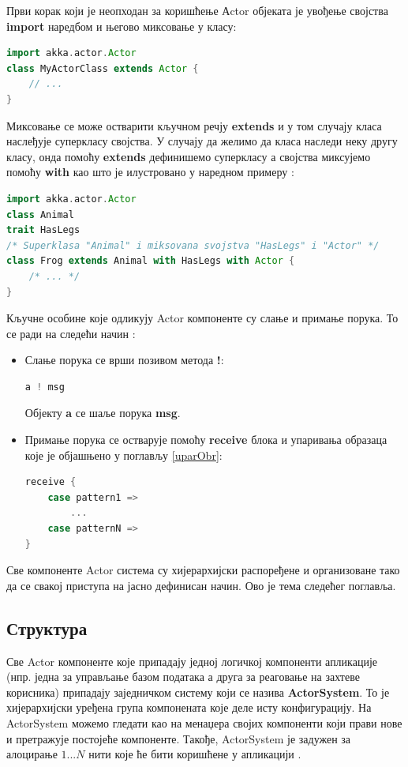 \documentclass[12pt,oneside]{memoir}
\begin{document}
Први корак који је неопходан за коришћење Аctor објеката је увођење својства \textbf{import} наредбом и његово миксовање у класу:
\begin{lstlisting}[language=Scala]
import akka.actor.Actor
class MyActorClass extends Actor {
	// ...
} 
\end{lstlisting}
Миксовање се може остварити кључном речју \textbf{extends} и у том случају класа наслеђује суперкласу својства. У случају да желимо да класа наследи неку другу класу, онда помоћу \textbf{extends} дефинишемо суперкласу а својства миксујемо помоћу \textbf{with} као што је илустровано у наредном примеру \cite{progInScala}: 

\begin{lstlisting}[language=Scala]
import akka.actor.Actor
class Animal
trait HasLegs
/* Superklasa "Animal" i miksovana svojstva "HasLegs" i "Actor" */
class Frog extends Animal with HasLegs with Actor {
	/* ... */
}
\end{lstlisting}

Кључне особине које одликују Actor компоненте су слање и примање порука. То се ради на следећи начин \cite{progInScala3}: 
\begin{itemize}
\item Слање порука се врши позивом метода \textbf{!}:
\begin{lstlisting}[language=Scala]
a ! msg
\end{lstlisting}
Објекту \textbf{a} се шаље порука \textbf{msg}.
\item Примање порука се остварује помоћу \textbf{receive} блока и упаривања образаца које је објашњено у поглављу \ref{uparObr}:
\begin{lstlisting}[language=Scala]
receive {
	case pattern1 => 
		...
	case patternN => 
}
\end{lstlisting}
\end{itemize}

Све компоненте Actor система су хијерархијски распоређене и организоване тако да се свакој приступа на јасно дефинисан начин. Ово је тема следећег поглавља.

\subsection{Структура}
\label{subsec:struktura}

Све Actor компоненте које припадају једној логичкој компоненти апликације (нпр. једна за управљање базом података а друга за реаговање на захтеве корисника) припадају заједничком систему који се назива \textbf{ActorSystem}. То је хијерархијски уређена група компонената које деле исту конфигурацију. На ActorSystem можемо гледати као на менаџера својих компоненти који прави нове и претражује постојеће компоненте. Такође, ActorSystem је задужен за алоцирање $1...N$ нити које ће бити коришћене у апликацији \cite{progInScala3, akkaDoc}.
\end{document}
